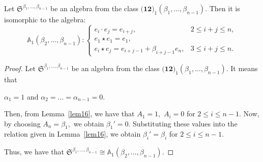 \documentclass{jonasart}
\begin{document}
	\begin{lemma}\label{12-lem-alpha_1} Let $\mathfrak{S}^{\beta_{1},\dots, \beta_{n-1}}$ be an algebra from the class $\textbf{(12)}_1 (\beta_{1},\dots,\beta_{n-1})$. Then it is isomorphic to the algebra:
		\[
			\mathbb{A}_1 (\beta_2,\dots,\beta_{n-1}):\left\{
			\begin{array}{ll}
				e_i \cdot e_j =e_{i+j}, & 2\leq i+j \leq n, \\[1mm]
				e_1 \star e_1 =e_{1}, \\[1mm]
				e_i \star e_j =e_{i+j-1}+\beta_{i+j-1}e_n, & 3\leq i+j \leq n.
			\end{array}
			\right.
		\]
	\end{lemma}

	\begin{proof}
		Let $\mathfrak{S}^{\beta_{1},\dots, \beta_{n-1}}$ be an algebra from the class $\textbf{(12)}_1 (\beta_{1},\dots,\beta_{n-1})$. It means that
		\begin{center}
			$\alpha_1 =1$ and $\alpha_2 =\dots =\alpha_{n-1}=0.$
		\end{center}
		Then, from Lemma~\ref{lem16}, we have that $A_1 =1,$ $A_i =0$ for $2 \leq i \leq n-1.$
		Now, by choosing $A_n = \beta_1,$ we obtain $\beta_1 ' = 0$. Substituting these values into the relation given in Lemma~\ref{lem16}, we obtain $\beta_i ' = \beta_i$ for $2 \le i \le n-1.$

		Thus, we have that
		$\mathfrak{S}^{ \beta_{1},\dots, \beta_{n-1}}\cong \mathbb{A}_1 (\beta_{2},\dots,\beta_{n-1})$.
	\end{proof}
\end{document}
